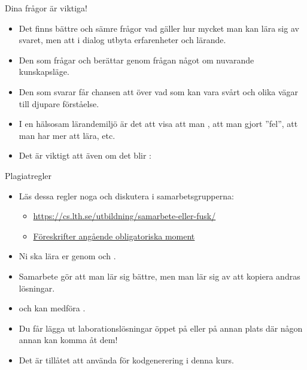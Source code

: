 \begin{SlideExtra}{Dina frågor är viktiga!}
\begin{itemize}
\item Det finns bättre och sämre frågor vad gäller hur mycket man kan lära sig av svaret, men  att i dialog utbyta erfarenheter och lärande.
\item Den som frågar  och berättar genom frågan något om nuvarande kunskapsläge.
\item Den som svarar får chansen att  över vad som kan vara svårt och olika vägar till djupare förståelse.
\item I en hälsosam lärandemiljö är det  att visa att man , att man gjort ''fel'', att man har mer att lära, etc.
\item Det är viktigt att  även om det blir :\\ 
\end{itemize}
\end{SlideExtra}

\begin{SlideExtra}{Plagiatregler}
\begin{itemize}
\item Läs dessa regler noga och diskutera i samarbetsgrupperna:

\begin{itemize}
\footnotesize
\item \url{https://cs.lth.se/utbildning/samarbete-eller-fusk/}
\item \href{https://cs.lth.se/utbildning/foereskrifter-angaaende-obligatoriska-moment/}{Föreskrifter angående obligatoriska moment}
\end{itemize}
\item Ni ska lära er genom  och  .
\item Samarbete gör att man lär sig bättre, men man lär sig  av att kopiera andras lösningar.
\item {} och kan medföra .
\item Du får  lägga ut laborationslösningar öppet på  eller på annan plats där någon annan kan komma åt dem!
\item Det är  tillåtet att använda  för kodgenerering i denna kurs.
\end{itemize}

\end{SlideExtra}

